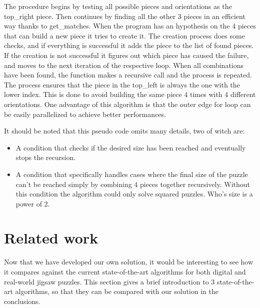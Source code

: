 \documentclass{article}
\begin{document}
The procedure begins by testing all possible pieces and orientations as the top\_right piece.
Then continues by finding all the other 3 pieces in an efficient way thanks to get\_matches.
When the program has an hypothesis on the 4 pieces that can build a new piece it tries to create it.\newline
The creation process does some checks, and if everything is successful it adds the piece to the list of found pieces.
If the creation is not successful it figures out which piece has caused the failure, and moves to the next iteration of the respective loop.\newline
When all combinations have been found, the function makes a recursive call and the process is repeated.\newline
The process ensures that the piece in the top\_left is always the one with the lower index.
This is done to avoid building the same piece 4 times with 4 different orientations.\newline
One advantage of this algorithm is that the outer edge for loop can be easily parallelized to achieve better performances.


It should be noted that this pseudo code omits many details, two of witch are:
\begin{itemize}
  \item A condition that checks if the desired size has been reached and eventually stops the recursion.
  \item A condition that specifically handles cases where the final size of the puzzle can't be reached simply by combining 4 pieces together recursively.
  Without this condition the algorithm could only solve squared puzzles. Who's size is a power of 2. 
\end{itemize}

\section{Related work}\label{document:related_work}
Now that we have developed our own solution, it would be
interesting to see how it compares against the current
state-of-the-art algorithms for both digital and real-world
jigsaw puzzles. This section gives a brief introduction to 3
state-of-the-art algorithms, so that they can be compared with
our solution in the conclusions.
\end{document}
